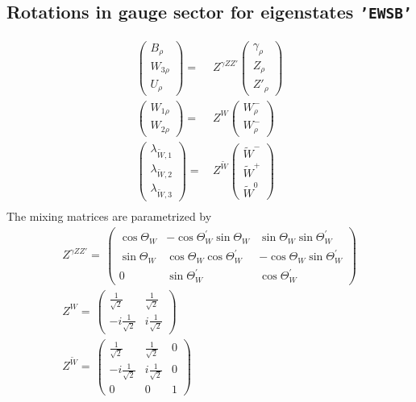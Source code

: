 \subsection{Rotations in gauge sector for eigenstates {\tt 'EWSB'} } 
\begin{align} 
\left(\begin{array}{c} 
B_{{\rho}}\\ 
W_{{3 \rho}}\\ 
U_{{\rho}}\end{array} \right) 
 = & \,Z^{\gamma Z Z'}
\left(\begin{array}{c} 
\gamma_{{\rho}}\\ 
Z_{{\rho}}\\ 
{Z'}_{{\rho}}\end{array} \right) \\ 
\left(\begin{array}{c} 
W_{{1 \rho}}\\ 
W_{{2 \rho}}\end{array} \right) 
 = & \,Z^{W}
\left(\begin{array}{c} 
W^-_{{\rho}}\\ 
W^-_{{\rho}}\end{array} \right) \\ 
\left(\begin{array}{c} 
\lambda_{{\tilde{W}},{1}}\\ 
\lambda_{{\tilde{W}},{2}}\\ 
\lambda_{{\tilde{W}},{3}}\end{array} \right) 
 = & \,Z^{\tilde{W}}
\left(\begin{array}{c} 
\tilde{W}^-\\ 
\tilde{W}^+\\ 
\tilde{W}^0\end{array} \right) \\ 
\end{align} 
The mixing matrices are parametrized by \\ 
\begin{align} 
Z^{\gamma Z Z'}= \, \left( 
\begin{array}{ccc} 
\cos\Theta_W  & - \cos\Theta_W^{\prime}  \sin\Theta_W   & \sin\Theta_W  \sin\Theta_W^{\prime}   \\ 
 \sin\Theta_W  & \cos\Theta_W  \cos\Theta_W^{\prime}   & - \cos\Theta_W  \sin\Theta_W^{\prime}   \\ 
 0 & \sin\Theta_W^{\prime}  & \cos\Theta_W^{\prime} \end{array} 
\right) \\ 
Z^{W}= \, \left( 
\begin{array}{cc} 
\frac{1}{\sqrt{2}} & \frac{1}{\sqrt{2}} \\ 
 -i \frac{1}{\sqrt{2}}  & i \frac{1}{\sqrt{2}} \end{array} 
\right) \\ 
Z^{\tilde{W}}= \, \left( 
\begin{array}{ccc} 
\frac{1}{\sqrt{2}} & \frac{1}{\sqrt{2}} & 0 \\ 
 -i \frac{1}{\sqrt{2}}  & i \frac{1}{\sqrt{2}}  & 0 \\ 
 0 & 0 & 1\end{array} 
\right) \\ 
\end{align} 

